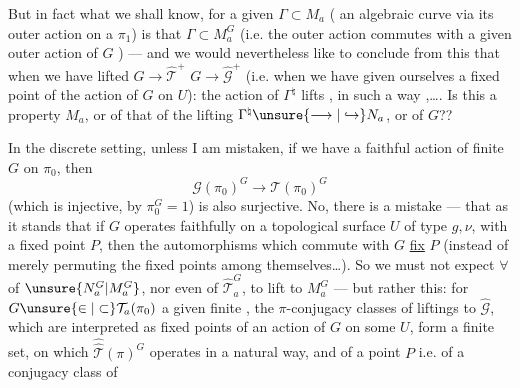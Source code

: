 But in fact what we shall know, for a given $\Gamma\subset M_a$ ( an algebraic curve via its outer action on a $\pi_1$) is that $\Gamma\subset M_a^G$ (i.e. the outer action commutes with a given outer action of $G$ ) --- and we would nevertheless like to conclude from this that when we have lifted $G\longrightarrow\widehat{\mathcal T}^{+}$  $G\longrightarrow\widehat{\mathcal G}^{+}$ (i.e. when we have given ourselves a fixed point of the action of $G$ on $U$):  the action of $\Gamma^{\natural}$ lifts  ,  in such a way  ,\ldots . Is this a property  $M_a$, or of that of the lifting $\Gamma^{\natural}\unsure{\longrightarrow|\hookrightarrow}N_a$, or of $G$??


In the discrete setting, unless I am mistaken, if we have a faithful action  of finite $G$ on $\pi_0$, then 
\[
\mathcal G(\pi_0)^G\longrightarrow\mathcal T(\pi_0)^G
\]
(which is injective, by $\pi_0^G=1$) is also surjective. No, there is a mistake --- that  as it stands that if $G$ operates faithfully on a topological surface $U$ of type $g,\nu$, with a fixed point $P$, then the automorphisms which commute with $G$ \uline{fix} $P$ (instead of merely permuting the fixed points among themselves\ldots). So we must not expect $\forall$  of $\unsure{N_a^G|M_a^G}$, nor even of $\widehat{\mathcal T}_a^G$, to lift to $M_a^G$ --- but rather this: for $G\unsure{\in|\subset}\mathcal T_a(\pi_0)$ a given finite , the $\pi$-conjugacy classes of liftings to $\widehat{\mathcal G}$,  which are interpreted as fixed points of an action of $G$ on some $U$, form a finite set, on which $\widehat{\widehat{\mathcal T}}(\pi)^G$ operates in a natural way, and   of a point $P$ i.e. of a conjugacy class of 
